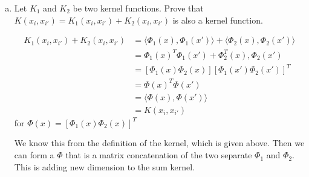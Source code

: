 \documentclass[11pt]{article}
\begin{document}
\begin{enumerate}[(c)]
\item Let $K_1$ and $K_2$ be two kernel functions. Prove that $K(x_i,x_{i'}) = K_1(x_i,x_{i'}) + K_2(x_i,x_{i'})$ is also a kernel function.

\begin{align*}
K_1(x_i,x_{i'}) + K_2(x_i,x_{i'}) &= \langle \Phi_1(x), \Phi_1(x') \rangle + \langle \Phi_2(x), \Phi_2(x') \rangle \\
&= \Phi_1(x)^T \Phi_1(x') + \Phi_2^T(x), \Phi_2(x') \\
&= [\Phi_1(x) \Phi_2(x)] [ \Phi_1(x') \Phi_2(x') ]^T      \\
&= \Phi(x)^T \Phi(x')	\\
&= \langle \Phi(x), \Phi(x') \rangle \\
&= K(x_i,x_{i'})
\end{align*}
for $\Phi(x) = [ \Phi_1(x) \Phi_2(x) ]^T$

We know this from the definition of the kernel, which is given above. Then we can form a $\Phi$ that is a matrix concatenation of the two separate $\Phi_1$ and $\Phi_2$. This is adding new dimension to the sum kernel.

\end{enumerate}



















\newpage
\end{document}
